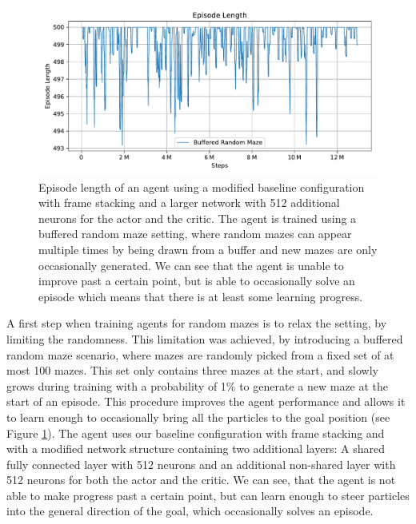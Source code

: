 \begin{figure}[htp]
    \begin{center}
        \includegraphics[clip, width=0.9\columnwidth]{figures/evaluation/randomness/instances/buffered_random_ep_len.pdf}
    \end{center}
    \caption[Episode Length on the Buffered Random Maze]{Episode length of an agent using a modified baseline configuration with frame stacking and a larger network with 512 additional neurons for the actor and the critic. The agent is trained using a buffered random maze setting, where random mazes can appear multiple times by being drawn from a buffer and new mazes are only occasionally generated. We can see that the agent is unable to improve past a certain point, but is able to occasionally solve an episode which means that there is at least some learning progress.} \label{fig:Eval/RandomInstance/Buffered}
\end{figure}

A first step when training agents for random mazes is to relax the setting, by limiting the randomness. This limitation was achieved, by introducing a buffered random maze scenario, where mazes are randomly picked from a fixed set of at most 100 mazes. This set only contains three mazes at the start, and slowly grows during training with a probability of 1\% to generate a new maze at the start of an episode. This procedure improves the agent performance and allows it to learn enough to occasionally bring all the particles to the goal position (see Figure \ref{fig:Eval/RandomInstance/Buffered}). The agent uses our baseline configuration with frame stacking and with a modified network structure containing two additional layers: A shared fully connected layer with 512 neurons and an additional non-shared layer with 512 neurons for both the actor and the critic. We can see, that the agent is not able to make progress past a certain point, but can learn enough to steer particles into the general direction of the goal, which occasionally solves an episode.

